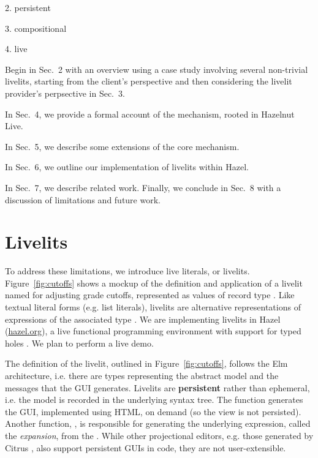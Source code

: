 2. persistent

3. compositional

4. live

Begin in Sec.~2 with an overview using a  case study involving several non-trivial livelits, starting 
from the client's perspective and then considering the livelit provider's perpsective in Sec.~3.

In Sec.~4, we provide a formal account of the mechanism, rooted in Hazelnut Live.

In Sec.~5, we describe some extensions of the core mechanism.

In Sec.~6, we outline our implementation of livelits within Hazel.

In Sec.~7, we describe related work. Finally, we conclude in Sec.~8 with a discussion of 
limitations and future work.



\section{Livelits}
To address these limitations, we introduce live literals, or livelits. Figure~\ref{fig:cutoffs} shows a mockup of the definition and application of a livelit named  for adjusting grade cutoffs, represented as values of  record type . Like textual literal forms (e.g. list literals), livelits are alternative representations of expressions of the associated type \cite{DBLP:journals/pacmpl/OmarA18}. %
We are implementing livelits in Hazel (\url{hazel.org}), a live functional programming environment with support for typed holes \cite{popl-paper}. We plan to perform a live demo.




The definition of
the livelit, outlined in Figure~\ref{fig:cutoffs}, follows the Elm architecture,
i.e. there are types representing the abstract model and the messages that the 
GUI generates. Livelits are \textbf{persistent} rather than ephemeral, i.e. the model is recorded in the underlying syntax tree. The  function generates the GUI, implemented using HTML, on demand (so the view is not persisted). Another function, , is responsible for generating the underlying expression, called the \emph{expansion}, from the . 
While other projectional editors, e.g. those generated by Citrus \cite{DBLP:conf/uist/KoM05}, also support persistent GUIs in code, they are not user-extensible. 

